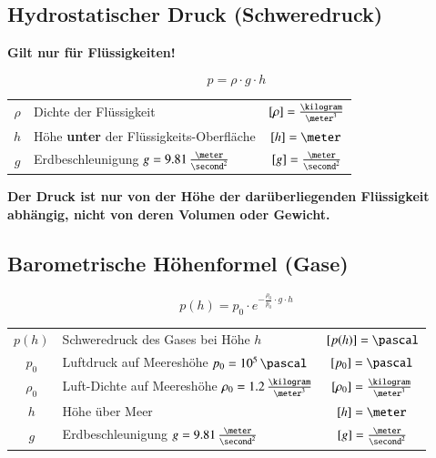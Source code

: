 \subsection{Hydrostatischer Druck (Schweredruck)}

\textbf{Gilt nur für Flüssigkeiten!} 

$$ \boxed{ p = \rho \cdot g \cdot h }$$	

\renewcommand{\arraystretch}{1.3}
\begin{tabular}{c l c}
    $\rho$  & Dichte der Flüssigkeit                                    & $[\rho] = \frac{\kilogram}{\meter^3}$ \\
    $h$     & Höhe \textbf{unter} der Flüssigkeits-Oberfläche           & $[h] = \meter$             
                        \\
    $g$     & Erdbeschleunigung $g = 9.81 \, \frac{\meter}{\second^2}$  & $[g] = \frac{\meter}{\second^2}$
\end{tabular}
\renewcommand{\arraystretch}{1}

\smallskip

\textbf{Der Druck ist nur von der Höhe der darüberliegenden Flüssigkeit abhängig, nicht von deren Volumen oder Gewicht.}


\subsection{Barometrische Höhenformel (Gase)}

\vspace{-0.2cm}

$$ \boxed{ p(h) = p_0 \cdot e^ {- \frac{\rho_0}{p_0} \cdot g \cdot h} }$$	


\begin{tabular}{c l c}
    $p(h)$      & Schweredruck des Gases bei Höhe $h$                    
                    & $[p(h)] = \pascal$                        \\
    $p_0$       & Luftdruck auf Meereshöhe $p_0 = 10^5 \, \pascal$                          & $[p_0] = \pascal$      
                    \\ 
    $\rho_0$    & Luft-Dichte auf Meereshöhe $\rho_0 = 1.2 \, \frac{\kilogram}{\meter^3}$   & $[\rho_0] = \frac{\kilogram}{\meter^3}$   \\
    $h$         & Höhe über Meer                                       
                     & $[h] = \meter$                            \\
    $g$         & Erdbeschleunigung $g = 9.81 \, \frac{\meter}{\second^2}$                  & $[g] = \frac{\meter}{\second^2}$    
\end{tabular}\vspace{1em}

